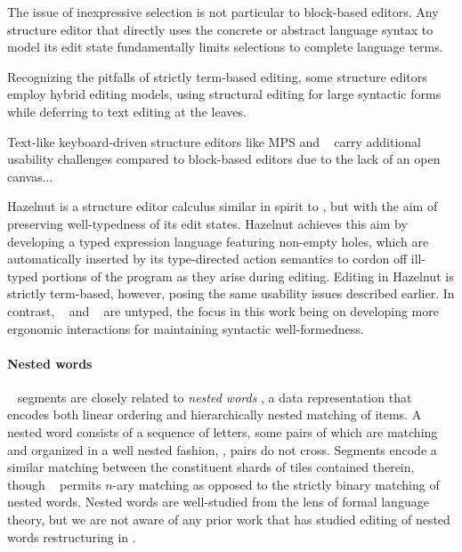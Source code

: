 The issue of inexpressive selection is not particular to
block-based editors.
Any structure editor that directly uses the
concrete or abstract language syntax to model
its edit state fundamentally limits selections to complete
language terms.


Recognizing the pitfalls of strictly term-based
editing, some structure editors
employ hybrid editing models, using structural editing
for large syntactic forms while deferring to text
editing at the leaves.


Text-like keyboard-driven structure editors
like MPS and \tylr~ carry additional usability challenges
compared to block-based editors due to the lack of an
open canvas...


Hazelnut \cite{Hazelnut} is a structure editor calculus
similar in spirit to \ty, but with the aim of
preserving well-typedness of its edit states.
Hazelnut achieves this aim by developing a typed
expression language featuring non-empty holes, which
are automatically inserted by its type-directed action
semantics to cordon off ill-typed portions of the program
as they arise during editing.
Editing in Hazelnut is strictly term-based, however, posing
the same usability issues described earlier.
In contrast, \ty~ and \tylr~ are untyped, the focus in
this work being on developing more ergonomic interactions
for maintaining syntactic well-formedness.

\paragraph{Nested words}
\ty~ segments are closely related to \emph{nested words}
\cite{nested-words},
a data representation that encodes both linear
ordering and hierarchically nested matching
of items.
A nested word consists of a sequence of letters,
some pairs of which are matching and organized
in a well nested fashion, \ie, pairs do not cross.
Segments encode a similar matching between the
constituent shards of tiles contained therein,
though \ty~ permits $n$-ary matching as opposed
to the strictly binary matching of nested words.
Nested words are well-studied from the lens of
formal language theory, but we are not aware of
any prior work that has studied editing of nested words
\ala restructuring in \tylr.

